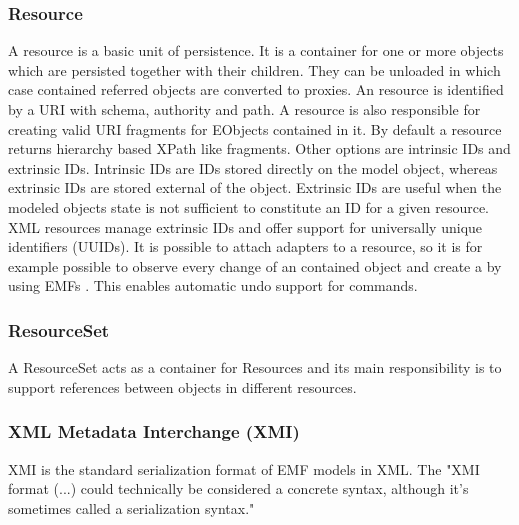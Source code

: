 \subsubsection{Resource}
A resource is a basic unit of persistence. It is a container for one or more objects which are persisted together with their children. They can be unloaded in which case contained referred objects  are converted to proxies. An resource is identified by a URI with schema, authority and path. A resource is also responsible for creating valid URI fragments for EObjects contained in it. By default a resource returns hierarchy based XPath like fragments. Other options are intrinsic IDs and extrinsic IDs. Intrinsic IDs are IDs stored directly on the model object, whereas extrinsic IDs are stored external of the object. Extrinsic IDs are useful when the modeled objects state is not sufficient to constitute an ID for a given resource. XML resources manage extrinsic IDs and offer support for universally unique identifiers (UUIDs). It is possible to attach adapters to a resource, so it is for example possible to observe every change of an contained object and create a  by using EMFs . This enables automatic undo support for commands. \cite{EMF2nd}

\subsubsection{ResourceSet}
A ResourceSet acts as a container for Resources and its main responsibility is to support references between objects in different resources. 

\subsubsection{XML Metadata Interchange (XMI)}
XMI is the standard serialization format of EMF models in XML. The "XMI format (...) could technically be considered a concrete syntax, although it's sometimes called a serialization syntax." \cite{EMP}

